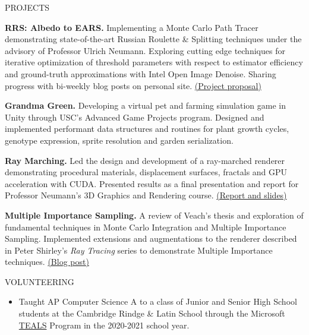 \documentclass{resume}
\begin{document}
\begin{rSection}{PROJECTS}

\vspace{-1.25em}
\item \textbf{RRS: Albedo to EARS.} {Implementing a Monte Carlo Path Tracer demonstrating state-of-the-art Russian Roulette \& Splitting techniques under the advisory of Professor Ulrich Neumann. Exploring cutting edge techniques for iterative optimization of threshold parameters with respect to estimator efficiency and ground-truth approximations with Intel Open Image Denoise. Sharing progress with bi-weekly blog posts on personal site. \href{https://blog.roblesch.page/assets/roblesch_project_proposal.pdf}{(Project proposal)}}
\item \textbf{Grandma Green.} {Developing a virtual pet and farming simulation game in Unity through USC's Advanced Game Projects program. Designed and implemented performant data structures and routines for plant growth cycles, genotype expression, sprite resolution and garden serialization.}
\item \textbf{Ray Marching.} {Led the design and development of a ray-marched renderer demonstrating procedural materials, displacement surfaces, fractals and GPU acceleration with CUDA. Presented results as a final presentation and report for Professor Neumann's 3D Graphics and Rendering course. \href{https://blog.roblesch.page/blog/2022/04/30/ray-marching.html}{(Report and slides)}}
\item \textbf{Multiple Importance Sampling.} {A review of Veach's thesis and exploration of fundamental techniques in Monte Carlo Integration and Multiple Importance Sampling. Implemented extensions and augmentations to the renderer described in Peter Shirley's \textit{Ray Tracing} series to demonstrate Multiple Importance techniques. \href{https://blog.roblesch.page/blog/2022/02/08/multiple-importance.html}{(Blog post)}}

\end{rSection} 





\begin{rSection}{VOLUNTEERING}

\begin{itemize}
    \item Taught AP Computer Science A to a class of Junior and Senior High School students at the Cambridge Rindge \& Latin School through the Microsoft \href{https://www.microsoft.com/en-us/teals}{TEALS} Program in the 2020-2021 school year.
\end{itemize}

\end{rSection}
\end{document}
